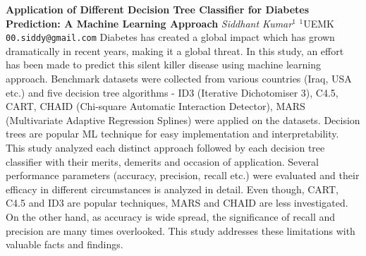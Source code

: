 
    \begin{conf-abstract}[]
        {\textbf{Application of Different Decision Tree Classifier for Diabetes Prediction: A Machine Learning Approach}}
        {\textit{Siddhant Kumar$^{1}$}}
        {$^{1}$UEMK}
        {\texttt{00.siddy@gmail.com}}
        {Diabetes has created a global impact which has grown dramatically in recent years, making it a global threat. In this study, an effort has been made to predict this silent killer disease using machine learning approach. Benchmark datasets were collected from various countries (Iraq, USA etc.) and five decision tree algorithms - ID3 (Iterative Dichotomiser 3), C4.5, CART, CHAID (Chi-square Automatic Interaction Detector), MARS (Multivariate Adaptive Regression Splines) were applied on the datasets. Decision trees are popular ML technique for easy implementation and interpretability. This study analyzed each distinct approach followed by each decision tree classifier with their merits, demerits and occasion of application. Several performance parameters (accuracy, precision, recall etc.) were evaluated and their efficacy in different circumstances is analyzed in detail. Even though, CART, C4.5 and ID3 are popular techniques, MARS and CHAID are less investigated. On the other hand, as accuracy is wide spread, the significance of recall and precision are many times overlooked. This study addresses these limitations with valuable facts and findings.}
    \end{conf-abstract}
        